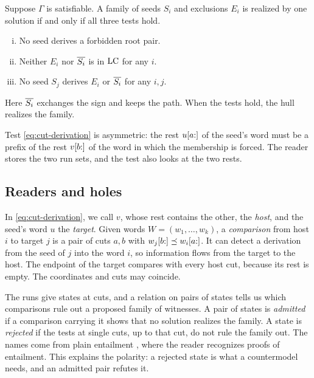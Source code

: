 \begin{lemma}\label{lem:realization}
Suppose $\Gamma$ is satisfiable. A family of seeds $S_i$ and exclusions
$E_i$ is realized by one solution if and only if all three tests hold.
\begin{enumerate}[(i)]
\item\label{it:seed-root} No seed derives a forbidden root pair.
\item\label{it:background} Neither $E_i$ nor $\overline{S_i}$ is in $\mathrm{LC}$ for any $i$.
\item\label{it:seed-interaction} No seed $S_j$ derives $E_i$ or $\overline{S_i}$ for any $i,j$.
\end{enumerate}
Here $\overline{S_i}$ exchanges the sign and keeps the path. When the tests
hold, the hull realizes the family.
\end{lemma}

Test \eqref{eq:cut-derivation} is asymmetric: the rest $u[a{:}]$ of the
seed's word must be a prefix of the rest $v[b{:}]$ of the word in which the
membership is forced. The reader stores the two run sets, and the test also
looks at the two rests.

\subsection{Readers and holes}
\label{sec:reader-compilation}

In \eqref{eq:cut-derivation}, we call $v$, whose rest contains the other,
the \emph{host}, and the seed's word $u$ the \emph{target}.
Given words $W=(w_1,\dots,w_k)$, a \emph{comparison} from host $i$
to target $j$ is a pair of cuts $a,b$ with $w_j[b{:}]\preceq w_i[a{:}]$.
It can detect a derivation from the seed of $j$ into the word $i$, so
information flows from the target to the host.
The endpoint of the target compares with every host cut, because its
rest is empty. The coordinates and cuts may coincide.

The runs give states at cuts, and a relation on pairs of states tells us
which comparisons rule out a proposed family of witnesses. A pair of
states is \emph{admitted} if a comparison carrying it shows that no
solution realizes the family. A state is \emph{rejected} if the tests at
single cuts, up to that cut, do not rule the family out. The names come
from plain entailment \cite{NSSE26}, where the reader recognizes proofs of
entailment. This explains the polarity: a rejected state is what a
countermodel needs, and an admitted pair refutes it.

